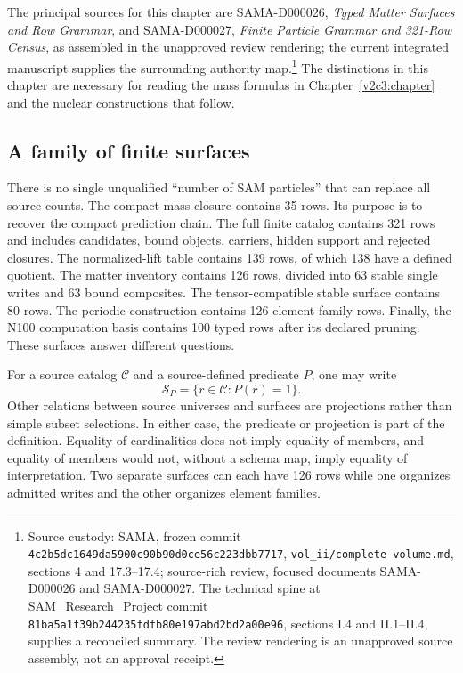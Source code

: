 The principal sources for this chapter are SAMA-D000026, \emph{Typed Matter Surfaces and Row Grammar}, and SAMA-D000027, \emph{Finite Particle Grammar and 321-Row Census}, as assembled in the unapproved review rendering; the current integrated manuscript supplies the surrounding authority map.\footnote{Source custody: SAMA, frozen commit \texttt{4c2b5dc1649da5900c90b90d0ce56c223dbb7717}, \texttt{vol\_ii/complete-volume.md}, sections 4 and 17.3--17.4; source-rich review, focused documents SAMA-D000026 and SAMA-D000027. The technical spine at SAM\_Research\_Project commit \texttt{81ba5a1f39b244235fdfb80e197abd2bd2a00e96}, sections I.4 and II.1--II.4, supplies a reconciled summary. The review rendering is an unapproved source assembly, not an approval receipt.} \cite{viisama,viispine,viireview} The distinctions in this chapter are necessary for reading the mass formulas in Chapter~\ref{v2c3:chapter} and the nuclear constructions that follow.

\subsection{A family of finite surfaces}

There is no single unqualified ``number of SAM particles'' that can replace all source counts. The compact mass closure contains 35 rows. Its purpose is to recover the compact prediction chain. The full finite catalog contains 321 rows and includes candidates, bound objects, carriers, hidden support and rejected closures. The normalized-lift table contains 139 rows, of which 138 have a defined quotient. The matter inventory contains 126 rows, divided into 63 stable single writes and 63 bound composites. The tensor-compatible stable surface contains 80 rows. The periodic construction contains 126 element-family rows. Finally, the N100 computation basis contains 100 typed rows after its declared pruning. These surfaces answer different questions.

For a source catalog $\mathcal C$ and a source-defined predicate $P$, one may write
\begin{equation}
\mathcal S_P=\{r\in\mathcal C:P(r)=1\}.
\label{v2c2:surface}
\end{equation}
Other relations between source universes and surfaces are projections rather than simple subset selections. In either case, the predicate or projection is part of the definition. Equality of cardinalities does not imply equality of members, and equality of members would not, without a schema map, imply equality of interpretation. Two separate surfaces can each have 126 rows while one organizes admitted writes and the other organizes element families.

